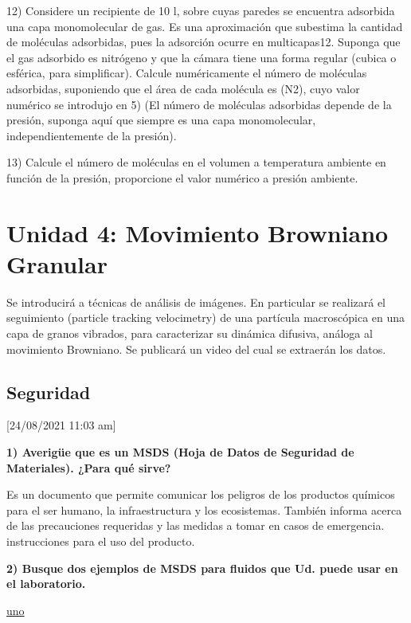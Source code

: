 \documentclass[letterpaper,11pt]{article}
\begin{document}
12) Considere un recipiente de 10 l, sobre cuyas paredes se encuentra adsorbida una
capa monomolecular de gas. Es una aproximación que subestima la cantidad de
moléculas adsorbidas, pues la adsorción ocurre en multicapas12. Suponga que el gas
adsorbido es nitrógeno y que la cámara tiene una forma regular (cubica o esférica,
para simplificar).
Calcule numéricamente el número de moléculas adsorbidas, suponiendo que el área
de cada molécula es (N2), cuyo valor numérico se introdujo en 5) (El número de moléculas adsorbidas depende de la presión, suponga aquí que siempre es una capa
monomolecular, independientemente de la presión).

13) Calcule el número de moléculas en el volumen a temperatura ambiente en función
de la presión, proporcione el valor numérico a presión ambiente.



\newpage

\section{Unidad 4: Movimiento Browniano Granular}

Se introducirá a técnicas de análisis de
imágenes. En particular se realizará el seguimiento (particle tracking velocimetry)
de una partícula macroscópica en una capa de granos vibrados, para caracterizar su dinámica difusiva, análoga al movimiento Browniano. Se publicará un video del cual se extraerán los datos.

\subsection{Seguridad}
[24/08/2021  11:03 am]

\textbf{1) Averigüe que es un MSDS (Hoja de Datos de Seguridad de Materiales). ¿Para qué sirve?}

Es un documento que permite comunicar los peligros de los productos químicos para el ser humano, la infraestructura y los ecosistemas. También informa acerca de las precauciones requeridas y las medidas a tomar en casos de emergencia.
instrucciones para el uso del producto. 

\textbf{2) Busque dos ejemplos de MSDS para fluidos que Ud. puede usar en el laboratorio.}

\href{https://quimicauniversal.cl/www/wp-content/uploads/2020/08/AGUARRAS-18-min.pdf}{uno}
\end{document}
